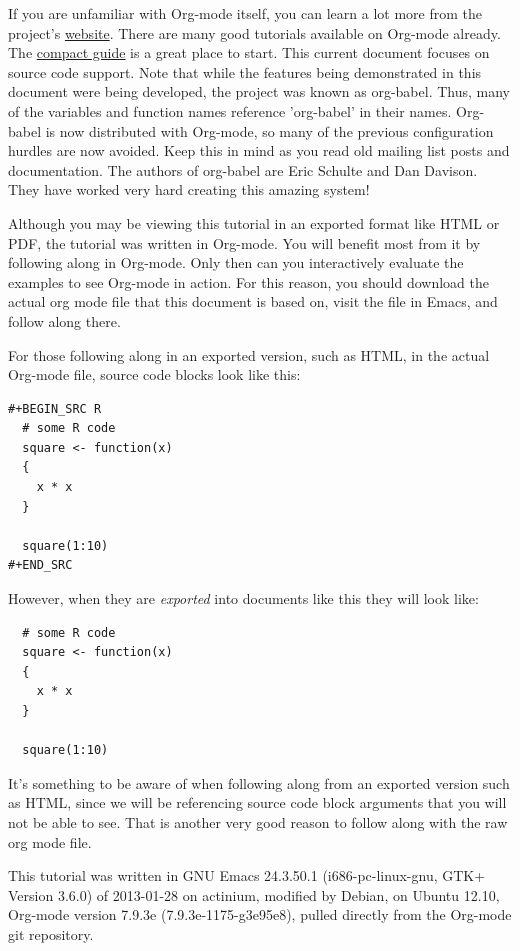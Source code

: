 \documentclass[11pt]{article}
\begin{document}
If you are unfamiliar with Org-mode itself, you can learn a lot more from the project's \href{http://orgmode.org}{website}. There are many good tutorials available on Org-mode already. The \href{http://orgmode.org/guide/index.html}{compact guide} is a great place to start. This current document focuses on source code support. Note that while the features being demonstrated in this document were being developed, the project was known as org-babel. Thus, many of the variables and function names reference 'org-babel' in their names. Org-babel is now distributed with Org-mode, so many of the previous configuration hurdles are now avoided. Keep this in mind as you read old mailing list posts and documentation. The authors of org-babel are Eric Schulte and Dan Davison. They have worked very hard creating this amazing system!

Although you may be viewing this tutorial in an exported format like HTML or PDF, the tutorial was written in Org-mode. You will benefit most from it by following along in Org-mode. Only then can you interactively evaluate the examples to see Org-mode in action. For this reason, you should download the actual org mode file that this document is based on, visit the file in Emacs, and follow along there.

For those following along in an exported version, such as HTML,  in the actual Org-mode file, source code blocks look like this: 

\begin{verbatim}
#+BEGIN_SRC R 
  # some R code 
  square <- function(x) 
  {
    x * x
  }
    
  square(1:10)
#+END_SRC
\end{verbatim}

However, when they are \emph{exported} into documents like this they will look like:

\begin{verbatim}
  # some R code 
  square <- function(x) 
  {
    x * x
  }
    
  square(1:10)
\end{verbatim}

It's something to be aware of when following along from an exported version such as HTML, since we will be referencing source code block arguments that you will not be able to see.  That is another very good reason to follow along with the raw org mode file.

This tutorial was written in GNU Emacs 24.3.50.1 (i686-pc-linux-gnu, GTK+ Version 3.6.0) of 2013-01-28 on actinium, modified by Debian, on Ubuntu 12.10, Org-mode version 7.9.3e (7.9.3e-1175-g3e95e8), pulled directly from the Org-mode git repository.
\end{document}
